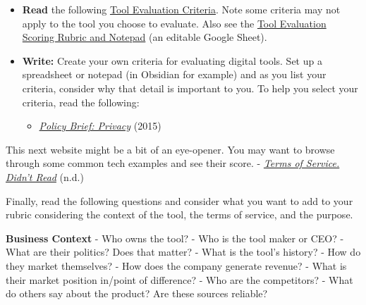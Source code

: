 \documentclass[
  letterpaper,
  DIV=11,
  numbers=noendperiod]{scrreprt}
\providecommand{\tightlist}{%
  \setlength{\itemsep}{0pt}\setlength{\parskip}{0pt}}\usepackage{longtable,booktabs,array}
\begin{document}
\begin{tcolorbox}[enhanced jigsaw, toprule=.15mm, colback=white, colframe=quarto-callout-note-color-frame, bottomtitle=1mm, leftrule=.75mm, coltitle=black, titlerule=0mm, rightrule=.15mm, colbacktitle=quarto-callout-note-color!10!white, left=2mm, title={Learning Activity}, opacitybacktitle=0.6, opacityback=0, breakable, toptitle=1mm, arc=.35mm, bottomrule=.15mm]

\begin{itemize}
\tightlist
\item
  \textbf{Read} the following
  \href{https://workforceedtech.org/tool-evaluation-criteria/}{Tool
  Evaluation Criteria}. Note some criteria may not apply to the tool you
  choose to evaluate. Also see the
  \href{https://docs.google.com/spreadsheets/d/1-zIw01FI0N6NKY2SdOO2PuniUxDxAG-beeTsmxRQru0/edit?usp=sharing/}{Tool
  Evaluation Scoring Rubric and Notepad} (an editable Google Sheet).
\end{itemize}

\begin{itemize}
\tightlist
\item
  \textbf{Write:} Create your own criteria for evaluating digital tools.
  Set up a spreadsheet or notepad (in Obsidian for example) and as you
  list your criteria, consider why that detail is important to you. To
  help you select your criteria, read the following:

  \begin{itemize}
  \tightlist
  \item
    \href{https://www.internetsociety.org/policybriefs/privacy/}{\emph{Policy
    Brief: Privacy}} (2015)
  \end{itemize}
\end{itemize}

This next website might be a bit of an eye-opener. You may want to
browse through some common tech examples and see their score. -
\emph{\href{https://tosdr.org/}{Terms of Service. Didn't Read}} (n.d.)

Finally, read the following questions and consider what you want to add
to your rubric considering the context of the tool, the terms of
service, and the purpose.

\textbf{Business Context} - Who owns the tool? - Who is the tool maker
or CEO? - What are their politics? Does that matter? - What is the
tool's history? - How do they market themselves? - How does the company
generate revenue? - What is their market position in/point of
difference? - Who are the competitors? - What do others say about the
product? Are these sources reliable?


\end{tcolorbox}
\end{document}
